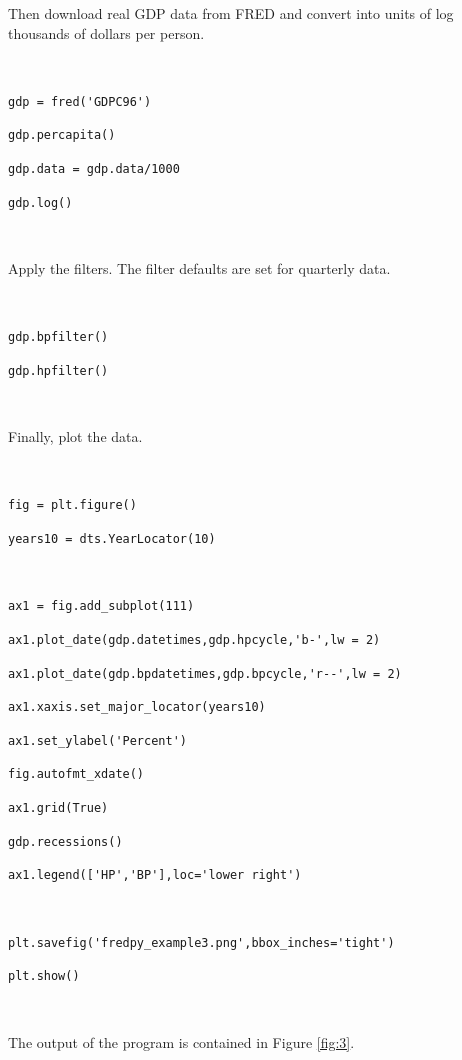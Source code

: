 \documentclass[11pt,fleqn]{article}
\newcommand{\ttt}{\texttt}
\begin{document}
\noindent Then download real GDP data from FRED and convert into units of log thousands of dollars per person.

\

\begin{minipage}{6.5in}
\verb!gdp = fred('GDPC96')!

\ttt{gdp.percapita()}

\ttt{gdp.data = gdp.data/1000}

\ttt{gdp.log()}

\

\end{minipage}

\noindent Apply the filters. The filter defaults are set for quarterly data.

\

\begin{minipage}{6in}
\ttt{gdp.bpfilter()}

\ttt{gdp.hpfilter()}

\

\end{minipage}

\noindent Finally, plot the data.

\

\begin{minipage}{6in}
\ttt{fig = plt.figure()}

\ttt{years10  = dts.YearLocator(10)}

\

\verb!ax1 = fig.add_subplot(111)!

\verb!ax1.plot_date(gdp.datetimes,gdp.hpcycle,'b-',lw = 2)!

\verb!ax1.plot_date(gdp.bpdatetimes,gdp.bpcycle,'r--',lw = 2)!

\verb!ax1.xaxis.set_major_locator(years10)!

\verb!ax1.set_ylabel('Percent')!

\verb!fig.autofmt_xdate()!

\ttt{ax1.grid(True)}

\ttt{gdp.recessions()}

\verb!ax1.legend(['HP','BP'],loc='lower right')!

\

\verb!plt.savefig('fredpy_example3.png',bbox_inches='tight')!

\ttt{plt.show()}

\

\end{minipage}

\noindent The output of the program is contained in Figure \ref{fig:3}.
\end{document}
